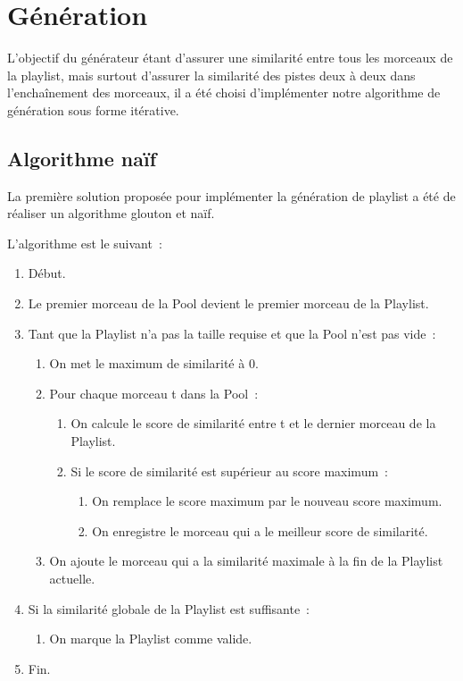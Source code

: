 \section{Génération}
\label{impl:generation}

L'objectif du générateur étant d'assurer une similarité entre tous les
morceaux de la playlist, mais surtout d'assurer la similarité des pistes deux
à deux dans l'enchaînement des morceaux, il a été choisi d'implémenter notre
algorithme de génération sous forme itérative.

\subsection{Algorithme naïf}
\label{impl:selection:naif}

La première solution proposée pour implémenter la génération de playlist a été
de réaliser un algorithme glouton et naïf.\newline

L'algorithme est le suivant~:

\begin{enumerate}
  \item Début.
  \item Le premier morceau de la Pool devient le premier morceau de la Playlist.
  \item Tant que la Playlist n'a pas la taille requise et que la Pool n'est pas
vide~:
  \begin{enumerate}
    \item On met le maximum de similarité à 0.
    \item Pour chaque morceau t dans la Pool~:
    \begin{enumerate}
      \item On calcule le score de similarité entre t et le dernier morceau
      de la Playlist.
      \item Si le score de similarité est supérieur au score maximum~:
      \begin{enumerate}
        \item On remplace le score maximum par le nouveau score maximum.
        \item On enregistre le morceau qui a le meilleur score de similarité.
      \end{enumerate}
    \end{enumerate}
    \item On ajoute le morceau qui a la similarité maximale à la fin de la
    Playlist actuelle.
  \end{enumerate}
  \item Si la similarité globale de la Playlist est suffisante~:
  \begin{enumerate}
    \item On marque la Playlist comme valide.
  \end{enumerate}
  \item Fin.
\end{enumerate}

